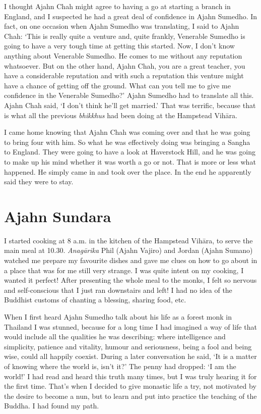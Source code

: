 I thought Ajahn Chah might agree to having a go at starting a branch in
England, and I suspected he had a great deal of confidence in Ajahn
Sumedho. In fact, on one occasion when Ajahn Sumedho was translating, I
said to Ajahn Chah: `This is really quite a venture and, quite frankly, 
Venerable Sumedho is going to have a very tough time at getting this
started. Now, I don't know anything about Venerable Sumedho. He comes to
me without any reputation whatsoever. But on the other hand, Ajahn Chah, 
you are a great teacher, you have a considerable reputation and with
such a reputation this venture might have a chance of getting off the
ground. What can you tell me to give me confidence in the Venerable
Sumedho?' Ajahn Sumedho had to translate all this. Ajahn Chah said, `I
don't think he'll get married.' That was terrific, because that is what
all the previous \emph{bhikkhus} had been doing at the Hampstead Vihāra.

I came home knowing that Ajahn Chah was coming over and that he was
going to bring four with him. So what he was effectively doing was
bringing a Sangha to England. They were going to have a look at
Haverstock Hill, and he was going to make up his mind whether it was
worth a go or not. That is more or less what happened. He simply came in
and took over the place. In the end he apparently said they were to
stay. 

\section{Ajahn Sundara}

I started cooking at 8 a.m. in the kitchen of the Hampstead Vihāra, to
serve the main meal at 10.30. \emph{Anagārika} Phil (Ajahn Vajiro) and
Jordan (Ajahn Sumano) watched me prepare my favourite dishes and gave me
clues on how to go about in a place that was for me still very strange. 
I was quite intent on my cooking, I wanted it perfect! After presenting
the whole meal to the monks, I felt so nervous and self-conscious that I
just ran downstairs and left! I had no idea of the Buddhist customs of
chanting a blessing, sharing food, etc. 

When I first heard Ajahn Sumedho talk about his life as a forest monk in
Thailand I was stunned, because for a long time I had imagined a way of
life that would include all the qualities he was describing: where
intelligence and simplicity, patience and vitality, humour and
seriousness, being a fool and being wise, could all happily coexist. 
During a later conversation he said, `It is a matter of knowing where
the world is, isn't it?' The penny had dropped: `I am the world!' I had
read and heard this truth many times, but I was truly hearing it for the
first time. That's when I decided to give monastic life a try, not
motivated by the desire to become a nun, but to learn and put into
practice the teaching of the Buddha. I had found my path. 

